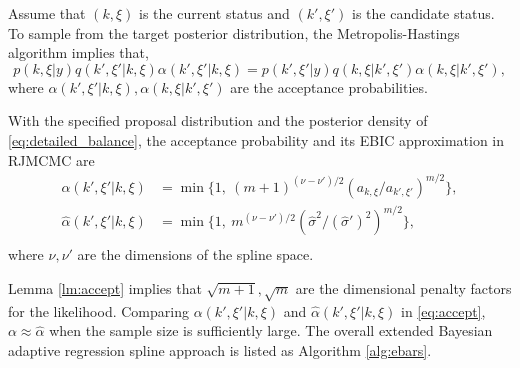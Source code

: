 Assume that $(k,\xi)$ is the current status and $(k',\xi')$ is the candidate status. To sample from the target posterior distribution, the Metropolis-Hastings algorithm implies that,
\begin{equation}
    \label{eq:detailed_balance}
    p(k,\xi|y)q(k',\xi'|k,\xi)\alpha(k',\xi'|k,\xi) = p(k',\xi'|y)q(k,\xi|k',\xi')\alpha(k,\xi|k',\xi'),
\end{equation}
where $\alpha(k',\xi'|k,\xi),\alpha(k,\xi|k',\xi')$ are the acceptance probabilities. %

\begin{lemma}
\label{lm:accept}
    With the specified proposal distribution and the posterior density of \eqref{eq:detailed_balance}, the acceptance probability and its EBIC approximation in RJMCMC are
    \begin{equation}
        \label{eq:accept}
        \begin{split}
            \alpha(k',\xi'|k,\xi) & = \min\{1, ~(m+1)^{(\nu-\nu')/2}(a_{k,\xi}/a_{k',\xi'})^{m/2}\},\\
            \hat{\alpha}(k',\xi'|k,\xi) & = \min \{1, ~ m^{(\nu-\nu')/2} ( \hat{\sigma}^2/(\hat{\sigma}')^2 )^{m/2} \},\\
        \end{split}
    \end{equation}
    where $\nu,\nu'$ are the dimensions of the spline space.
\end{lemma}

Lemma \ref{lm:accept} implies that $\sqrt{m+1},\sqrt{m}$ are the dimensional penalty factors for the likelihood. %
Comparing $\alpha(k',\xi'|k,\xi)$ and $\hat{\alpha}(k',\xi'|k,\xi)$ in \eqref{eq:accept}, $\alpha\approx \hat{\alpha}$ when the sample size is sufficiently large. The overall extended Bayesian adaptive regression spline approach is listed as Algorithm \ref{alg:ebars}.


